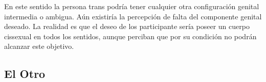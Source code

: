  En este sentido la persona trans podría tener cualquier otra configuración
 genital intermedia o ambigua. Aún existiría la percepción de falta del
 componente genital deseado. La realidad es que el deseo de los participante
 sería poseer un cuerpo cissexual en todos los sentidos, aunque perciban que por
 su condición no podrán alcanzar este objetivo.

\subsection{El Otro}
%
%
